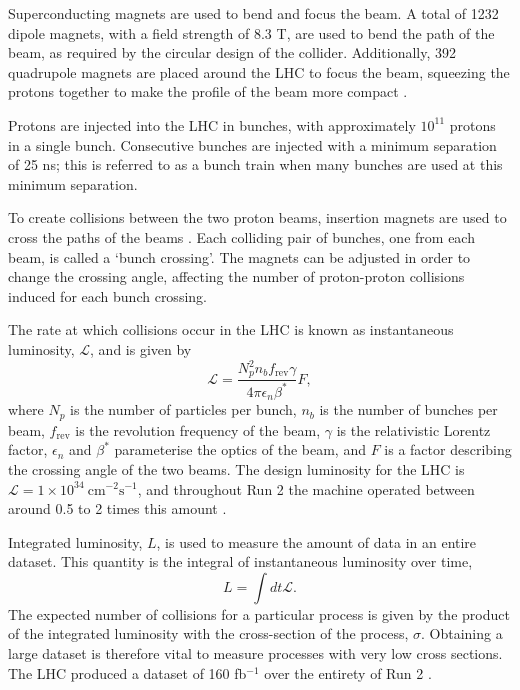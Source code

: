 Superconducting magnets are used to bend and focus the beam. A total of
1232 dipole magnets, with a field strength of 8.3 T, are used to
bend the path of the beam, as required by the circular design of the collider.
Additionally, 392 quadrupole magnets are placed around the \ac{LHC} to focus the
beam, squeezing the protons together to make the profile of the beam more
compact \cite{LHCVol1}.

Protons are injected into the \ac{LHC} in bunches, with approximately $10^{11}$
protons in a single bunch. Consecutive bunches are injected with a minimum
separation of 25 ns; this is referred to as a bunch train when many bunches are
used at this minimum separation.

To create collisions between the two proton beams, insertion magnets are used to
cross the paths of the beams \cite{Ostojic2002}. Each colliding pair of bunches,
one from each beam, is called a `bunch crossing'. The magnets can be adjusted in
order to change the crossing angle, affecting the number of proton-proton
collisions induced for each bunch crossing.

The rate at which collisions occur in the \ac{LHC} is known as instantaneous
luminosity, $\mathcal{L}$, and is given by
\begin{equation*}
  \mathcal{L} = \frac{ N_p^2 n_b f_\text{rev} \gamma }
  { 4 \pi \epsilon_n \beta^*} F,
\end{equation*}
%
where $N_p$ is the number of particles per bunch, $n_b$ is the number of bunches
per beam, $f_\text{rev}$ is the revolution frequency of the beam, $\gamma$ is
the relativistic Lorentz factor, $\epsilon_n$ and $\beta^*$ parameterise the
optics of the beam, and $F$ is a factor describing the crossing angle of the two
beams. The design luminosity for the \ac{LHC} is $\mathcal{L} =
1\times10^{34}~\text{cm}^{-2}\text{s}^{-1}$, and throughout Run 2 the machine
operated between around 0.5 to 2 times this amount \cite{Steerenberg2019}.

Integrated luminosity, $L$, is used to measure the amount of data in an entire
dataset. This quantity is the integral of instantaneous luminosity over time,
\begin{equation*}
  L = \int dt \mathcal{L}.
\end{equation*}
The expected number of collisions for a particular process is given by the
product of the integrated luminosity with the cross-section of the process,
$\sigma$. Obtaining a large dataset is therefore vital to measure processes with
very low cross sections. The \ac{LHC} produced a dataset of 160 fb$^{-1}$ over
the entirety of Run 2 \cite{Steerenberg2019}.

